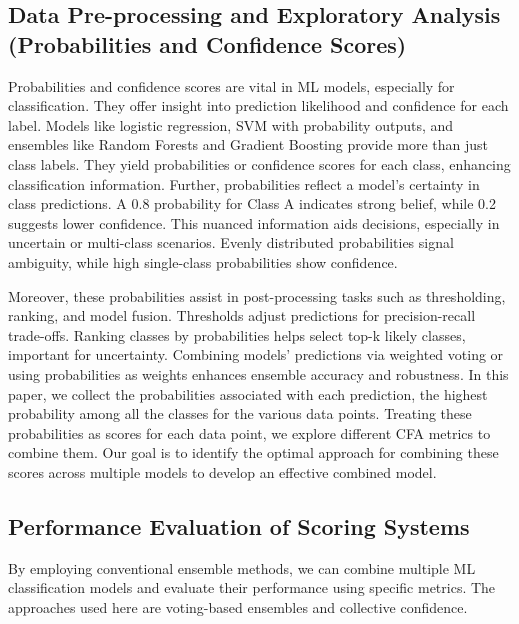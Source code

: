 \subsection{Data Pre-processing and Exploratory Analysis (Probabilities and Confidence Scores)}

Probabilities and confidence scores are vital in ML models, especially for classification. They offer insight into prediction likelihood and confidence for each label. Models like logistic regression, SVM with probability outputs, and ensembles like Random Forests and Gradient Boosting provide more than just class labels. They yield probabilities or confidence scores for each class, enhancing classification information. Further, probabilities reflect a model's certainty in class predictions. A 0.8 probability for Class A indicates strong belief, while 0.2 suggests lower confidence. This nuanced information aids decisions, especially in uncertain or multi-class scenarios. Evenly distributed probabilities signal ambiguity, while high single-class probabilities show confidence.

Moreover, these probabilities assist in post-processing tasks such as thresholding, ranking, and model fusion. Thresholds adjust predictions for precision-recall trade-offs. Ranking classes by probabilities helps select top-k likely classes, important for uncertainty. Combining models' predictions via weighted voting or using probabilities as weights enhances ensemble accuracy and robustness. In this paper, we collect the probabilities associated with each prediction, the highest probability among all the classes for the various data points. Treating these probabilities as scores for each data point, we explore different CFA metrics to combine them. Our goal is to identify the optimal approach for combining these scores across multiple models to develop an effective combined model.

\subsection{Performance Evaluation of Scoring Systems}

By employing conventional ensemble methods, we can combine multiple ML classification models and evaluate their performance using specific metrics. The approaches used here are voting-based ensembles and collective confidence.

